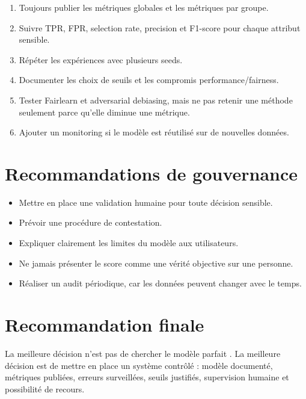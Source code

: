 \documentclass[12pt,a4paper]{report}
\begin{document}
\begin{tcolorbox}[successbox, title={À mettre en place avant tout usage sensible}]
\begin{enumerate}
  \item Toujours publier les métriques globales et les métriques par groupe.
  \item Suivre TPR, FPR, selection rate, precision et F1-score pour chaque attribut sensible.
  \item Répéter les expériences avec plusieurs seeds.
  \item Documenter les choix de seuils et les compromis performance/fairness.
  \item Tester Fairlearn et adversarial debiasing, mais ne pas retenir une méthode seulement parce qu'elle diminue une métrique.
  \item Ajouter un monitoring si le modèle est réutilisé sur de nouvelles données.
\end{enumerate}
\end{tcolorbox}

\section{Recommandations de gouvernance}

\begin{tcolorbox}[warningbox, title={Gouvernance indispensable}]
\begin{itemize}
  \item Mettre en place une validation humaine pour toute décision sensible.
  \item Prévoir une procédure de contestation.
  \item Expliquer clairement les limites du modèle aux utilisateurs.
  \item Ne jamais présenter le score comme une vérité objective sur une personne.
  \item Réaliser un audit périodique, car les données peuvent changer avec le temps.
\end{itemize}
\end{tcolorbox}

\section{Recommandation finale}

La meilleure décision n'est pas de chercher \og le modèle parfait \fg{}. La meilleure décision est de mettre en place un système contrôlé : modèle documenté, métriques publiées, erreurs surveillées, seuils justifiés, supervision humaine et possibilité de recours.
\end{document}
